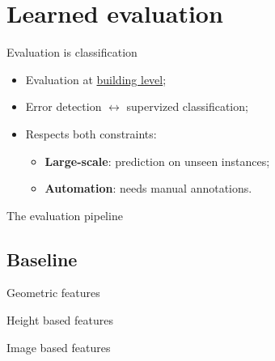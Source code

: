 \documentclass[12pt]{beamer}
\begin{document}
    \section{Learned evaluation}
        \begin{frame}{Evaluation is classification}
            \begin{itemize}[label=$\blacktriangleright$, font=\color{IGNGreen}]
                \item<1-> Evaluation at \underline{building level};
                \item<2-> Error detection \(\leftrightarrow\) supervized classification;
                \item<3-> Respects both constraints:
                    \begin{itemize}[label=$\blacktriangleright$, font=\color{IGNGreen}]
                        \item<4-> \textbf{Large-scale}: prediction on unseen instances;
                        \item<5-> \textbf{Automation}: needs manual annotations.
                    \end{itemize}
            \end{itemize}
        \end{frame}

        \begin{frame}{The evaluation pipeline}
            \begin{figure}[H]
                
            \end{figure}
        \end{frame}

        \subsection{Baseline}
            \begin{frame}{Geometric features}
                \centering
                
            \end{frame}
            \begin{frame}{Height based features}
                \centering
                                
            \end{frame}
            \begin{frame}{Image based features}
                \centering
                                
            \end{frame}
\end{document}
